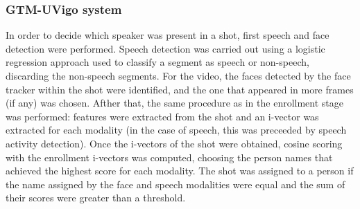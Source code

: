 \subsubsection{GTM-UVigo system}

In order to decide which speaker was present in a shot, first speech and face detection were performed. Speech detection was carried out using a logistic regression approach
used to classify a segment as speech or non-speech, discarding the non-speech segments. For the video, the faces detected by the face tracker within the shot were identified, 
and the one that appeared in more frames (if any) was chosen. Afther that, the same procedure as in the enrollment stage was performed: features were extracted from the shot
and an i-vector was extracted for each modality (in the case of speech, this was preceeded by speech activity detection). Once the i-vectors of the shot were obtained,
cosine scoring with the enrollment i-vectors was computed, choosing the person names that achieved the highest score for each modality. The shot was assigned to
a person if the name assigned by the face and
speech modalities were equal and the sum of their scores were greater than a threshold.

\endinput